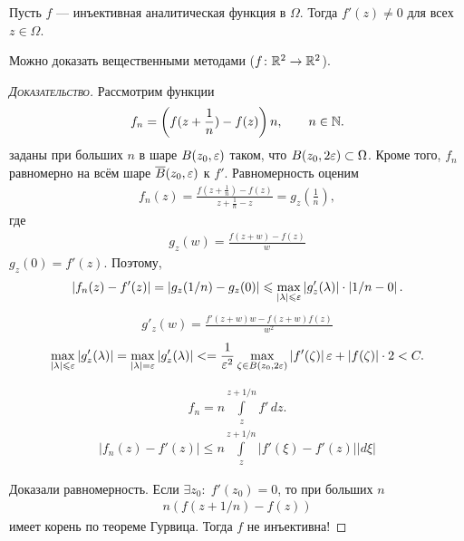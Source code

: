 \documentclass[../complex-analysis.tex]{subfiles}
\begin{document}
 \begin{thm}
  Пусть $ f $ --- инъективная аналитическая функция в $ \Omega $. Тогда $ f'(z) \neq 0 $ для всех $ z \in \Omega $.
 \end{thm}
 Можно доказать вещественными методами ($ f \colon \mathbb{R}^{2}\to\mathbb{R}^{2} $).
 \begin{proof}[\normalfont\textsc{Доказательство}]
  Рассмотрим функции
  \begin{align*}
   f_n = \left(f(z + \frac{1}{n}) - f(z) \right)n, \qquad n \in \mathbb{N}. 
  \end{align*} заданы при больших $ n $ в шаре $ B(z_0, \varepsilon) $ таком, что $ B(z_0, 2\varepsilon) \subset \Omega $. Кроме того, $ f_n $ равномерно на всём шаре $ \overline B(z_0,\varepsilon) $ к $ f' $. Равномерность оценим
  \begin{align*}
   f_n(z) = \frac{f\left(z + \frac{1}{n}\right) - f(z)}{z + \frac{1}{n} - z} = g_z \left( \frac{1}{n} \right),
  \end{align*} где \begin{align*}
   g_z(w) = \frac{f(z+w)-f(z)}{w}
  \end{align*} $ g_z(0) = f'(z) $. Поэтому,
  \begin{align*}
   \left|f_n(z) - f'(z) \right| = \left|g_z(1 / n) - g_z(0) \right| \leqslant \max_{\left| \lambda \right| \leqslant \varepsilon} \left| g'_z(\lambda) \right| \cdot \left| 1 / n - 0 \right|.
  \end{align*}
  \begin{align*}
   g'_z(w) = \frac{f'(z + w)w - f(z + w)f(z)}{w^{2}}
  \end{align*}
  \begin{align*}
   \max_{\left| \lambda \right| \leqslant \varepsilon} \left| g'_z(\lambda) \right| = \max_{\left| \lambda \right|=\varepsilon} \left| g'_z(\lambda) \right| <= \frac{1}{\varepsilon^{2}} \max_{\zeta \in B(z_0,2\varepsilon)} \left| f'(\zeta) \right| \varepsilon + \left| f(\zeta) \right| \cdot 2 < C.
  \end{align*}

  \begin{align*}
   f_n = n\int\limits_{z}^{z+1 / n} f'\,dz.
  \end{align*}
  \begin{align*}
   \left|f_n(z) - f'(z) \right| \leqslant n \int\limits_{z}^{z + 1 / n} \left| f'(\xi) -f'(z)\right| \left| d\xi \right|
  \end{align*}

  Доказали равномерность. Если $ \exists z_0 \colon\; f'(z_0) = 0  $, то при больших $ n $
  \begin{align*}
   n(f(z + 1 / n) - f(z))
  \end{align*} имеет корень по теореме Гурвица. Тогда $ f $ не инъективна!
 \end{proof}
\end{document}
